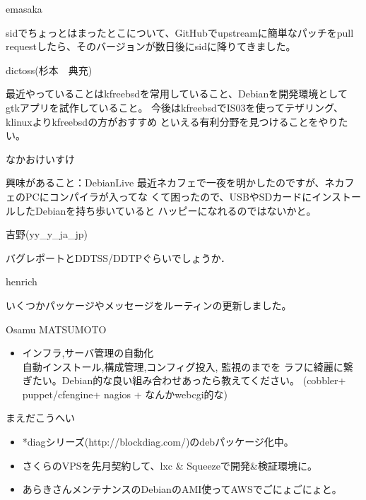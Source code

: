 \begin{prework}{ emasaka }

sidでちょっとはまったとこについて、GitHubでupstreamに簡単なパッチをpull
 requestしたら、そのバージョンが数日後にsidに降りてきました。
\end{prework}

\begin{prework}{ dictoss(杉本　典充) }

最近やっていることはkfreebsdを常用していること、Debianを開発環境として
 gtkアプリを試作していること。
今後はkfreebsdでIS03を使ってテザリング、klinuxよりkfreebsdの方がおすすめ
 といえる有利分野を見つけることをやりたい。
\end{prework}

\begin{prework}{ なかおけいすけ }

興味があること：DebianLive
最近ネカフェで一夜を明かしたのですが、ネカフェのPCにコンパイラが入ってな
 くて困ったので、USBやSDカードにインストールしたDebianを持ち歩いていると
 ハッピーになれるのではないかと。
\end{prework}

\begin{prework}{ 吉野(yy\_y\_ja\_jp) }

バグレポートとDDTSS/DDTPぐらいでしょうか．
\end{prework}

\begin{prework}{ henrich }

いくつかパッケージやメッセージをルーティンの更新しました。

\end{prework}

\begin{prework}{ Osamu MATSUMOTO }

\begin{itemize}
\item インフラ,サーバ管理の自動化\\
 自動インストール,構成管理,コンフィグ投入, 監視のまでを
 ラフに綺麗に繋ぎたい。Debian的な良い組み合わせあったら教えてください。
 (cobbler+ puppet/cfengine+ nagios + なんかwebcgi的な)
\end{itemize}

\end{prework}

\begin{prework}{ まえだこうへい }
\begin{itemize}
\item *diagシリーズ(http://blockdiag.com/)のdebパッケージ化中。
\item さくらのVPSを先月契約して、lxc \& Squeezeで開発\&検証環境に。
\item あらきさんメンテナンスのDebianのAMI使ってAWSでごにょごにょと。
\end{itemize}
\end{prework}


